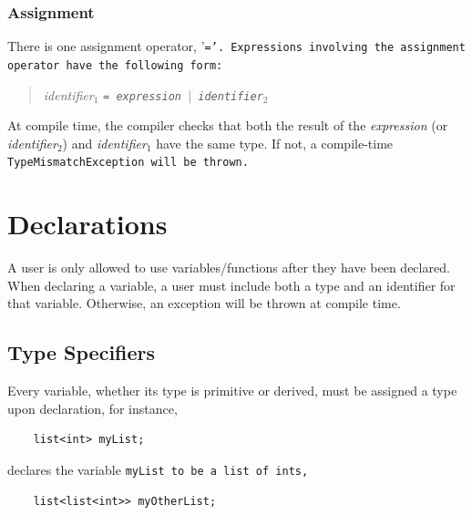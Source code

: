 \documentclass{report}
\begin{document}

\subsubsection{Assignment} %
\label{ssub:assignment}

There is one assignment operator, '\tt =\rm'. Expressions involving the
assignment operator have the following form:

\begin{quotation}
\emph{identifier}$_1$ \tt = \rm \emph{expression} $|$ \emph{identifier}$_2$
\end{quotation}

At compile time, the compiler checks that both the result of the \emph{expression}
(or \emph{identifier}$_2$) and \emph{identifier}$_1$ have the same type. If not, a
compile-time \tt TypeMismatchException \rm will be thrown.




\section{Declarations} %
\label{sec:declarations}

A user is only allowed to use variables/functions after they have been
declared. When declaring a variable, a user must include both a type and an
identifier for that variable. Otherwise, an exception will be thrown at compile
time.

\subsection{Type Specifiers} %
\label{sub:type_specifiers}

Every variable, whether its type is primitive or derived, must be assigned a
type upon declaration, for instance,

\begin{verbatim}
    list<int> myList;
\end{verbatim}

declares the variable \tt myList \rm to be a \tt list \rm of \tt int\rm s,

\begin{verbatim}
    list<list<int>> myOtherList;
\end{verbatim}
\end{document}
